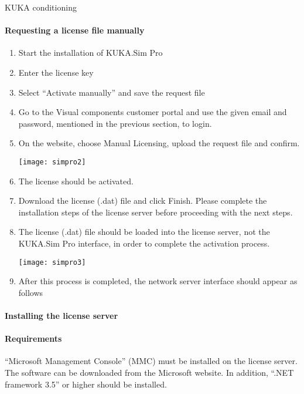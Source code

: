 \documentclass{book}
\begin{document}
\begin{chapter}{KUKA conditioning}
 				\paragraph{Requesting a license file manually}
 					\begin{enumerate}
 						\item Start the installation of KUKA.Sim Pro 
 						\item Enter the license key
 						\item Select “Activate manually” and save the request file
 						\item Go to the Visual components customer portal and use the given email and password, mentioned in the previous section, to login.
 						\item On the website, choose Manual Licensing, upload the request file and confirm.
 						
 						\begin{center}
						\texttt{[image: simpro2]}
 						\end{center}
 					
 					
 						
 						\item The license should be activated.
 						\item Download the license (.dat) file and click Finish. Please complete the installation steps of the license server before proceeding with the next steps.
 						\item The license (.dat) file should be loaded into the license server, not the KUKA.Sim Pro interface, in order to complete the activation process. 
 						
						\texttt{[image: simpro3]}
						 						
 						\item After this process is completed, the network server interface should appear as follows
 					\end{enumerate}
 				
 				\paragraph{Installing the license server}
 				\paragraph{Requirements}
 				“Microsoft Management Console” (MMC) must be installed on the license server. The software can be downloaded from the Microsoft website. In addition, “.NET framework 3.5” or higher should be installed. 
 				

\end{chapter}
\end{document}
